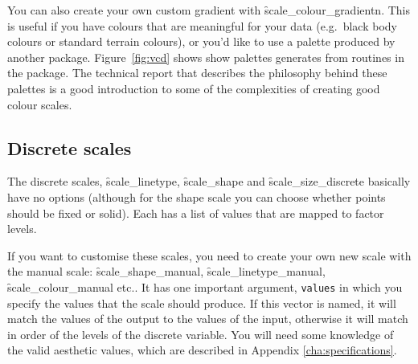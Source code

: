 
You can also create your own custom gradient with \f{scale_colour_gradientn}.  This is useful if you have colours that are meaningful for your data (e.g.\ black body colours or standard terrain colours), or you'd like to use a palette produced by another package.  Figure~\ref{fig:vcd} shows show palettes generates from routines in the  package.  The technical report \citet{zeileis:2007} that describes the philosophy behind these palettes is a good introduction to some of the complexities of creating good colour scales.

% 


\subsection{Discrete scales}
\label{sub:scale-discrete}

The discrete scales, \f{scale_linetype}, \f{scale_shape} and \f{scale_size_discrete} basically have no options (although for the shape scale you can choose whether points should be fixed or solid). Each has a list of values that are mapped to factor levels.

If you want to customise these scales, you need to create your own new scale with the manual scale: \f{scale_shape_manual}, \f{scale_linetype_manual}, \f{scale_colour_manual} etc..  It has one important argument, \verb|values| in which you specify the values that the scale should produce.  If this vector is named, it will match the values of the output to the values of the input, otherwise it will match in order of the levels of the discrete variable.   You will need some knowledge of the valid aesthetic values, which are described in Appendix \ref{cha:specifications}.


